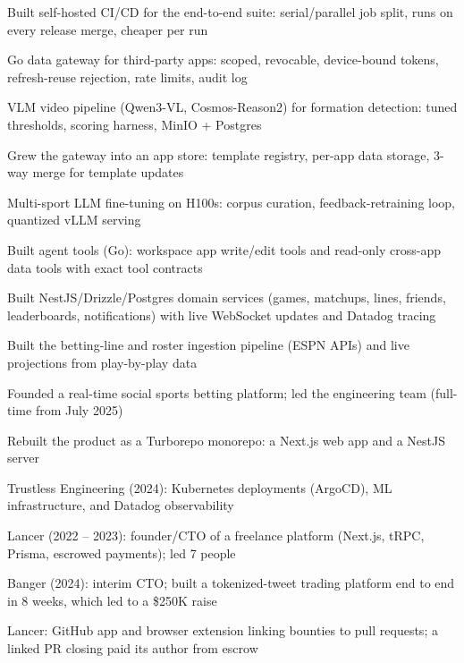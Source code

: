\documentclass[print]{jack-resume}
\begin{document}
\begin{tightemize}
    \item Built self-hosted CI/CD for the end-to-end suite: serial/parallel job split, runs on every release merge, cheaper per run
    \item Go data gateway for third-party apps: scoped, revocable, device-bound tokens, refresh-reuse rejection, rate limits, audit log
    \item VLM video pipeline (Qwen3-VL, Cosmos-Reason2) for formation detection: tuned thresholds, scoring harness, MinIO + Postgres
    \item Grew the gateway into an app store: template registry, per-app data storage, 3-way merge for template updates
    \item Multi-sport LLM fine-tuning on H100s: corpus curation, feedback-retraining loop, quantized vLLM serving
    \item Built agent tools (Go): workspace app write/edit tools and read-only cross-app data tools with exact tool contracts
\end{tightemize}
\sectionsep

\begin{tightemize}
    \item Built NestJS/Drizzle/Postgres domain services (games, matchups, lines, friends, leaderboards, notifications) with live WebSocket updates and Datadog tracing
    \item Built the betting-line and roster ingestion pipeline (ESPN APIs) and live projections from play-by-play data
    \item Founded a real-time social sports betting platform; led the engineering team (full-time from July 2025)
    \item Rebuilt the product as a Turborepo monorepo: a Next.js web app and a NestJS server
\end{tightemize}
\sectionsep

\begin{tightemize}
    \item Trustless Engineering (2024): Kubernetes deployments (ArgoCD), ML infrastructure, and Datadog observability
    \item Lancer (2022 -- 2023): founder/CTO of a freelance platform (Next.js, tRPC, Prisma, escrowed payments); led 7 people
    \item Banger (2024): interim CTO; built a tokenized-tweet trading platform end to end in 8 weeks, which led to a \$250K raise
    \item Lancer: GitHub app and browser extension linking bounties to pull requests; a linked PR closing paid its author from escrow
\end{tightemize}
\sectionsep
\end{document}
